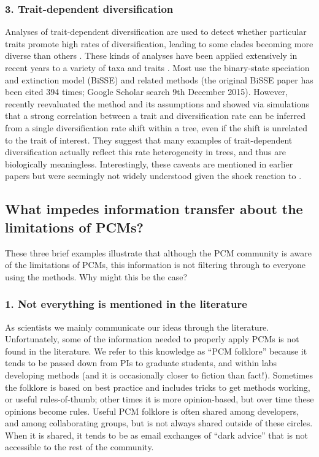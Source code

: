 \documentclass[a4paper,12pt]{article}
\begin{document}
\subsubsection{3. Trait-dependent diversification} 
Analyses of trait-dependent diversification are used to detect whether particular traits promote high rates of diversification, leading to some clades becoming more diverse than others \citep{nee1994reconstructed}. 
These kinds of analyses have been applied extensively in recent years to a variety of taxa and traits \citep[e.g.][]{Goldberg22102010,Price01052012,Givnish201455,ELE:ELE12168}.
Most use the binary-state speciation and extinction model (BiSSE) and related methods (the original BiSSE paper \citet{maddison2007estimating} has been cited 394 times; Google Scholar search 9th December 2015).
However, \citet{rabosky2015model} recently reevaluated the method and its assumptions and showed via simulations that a strong correlation between a trait and diversification rate can be inferred from a single diversification rate shift within a tree, even if the shift is unrelated to the trait of interest.
They suggest that many examples of trait-dependent diversification actually reflect this rate heterogeneity in trees, and thus are biologically meaningless.
Interestingly, these caveats are mentioned in earlier papers \citep{maddison2007estimating,fitzjohn2010quantitative,FitzJohn:2012aa} but were seemingly not widely understood given the shock reaction to \citet{rabosky2015model}.

\subsection{What impedes information transfer about the limitations of PCMs?}
These three brief examples illustrate that although the PCM community is aware of the limitations of PCMs, this information is not filtering through to everyone using the methods. 
Why might this be the case?

  \subsubsection{1. Not everything is mentioned in the literature}
    As scientists we mainly communicate our ideas through the literature. 
    Unfortunately, some of the information needed to properly apply PCMs is not found in the literature. 
    We refer to this knowledge as ``PCM folklore'' because it tends to be passed down from PIs to graduate students, and within labs developing methods (and it is occasionally closer to fiction than fact!).
    Sometimes the folklore is based on best practice and includes tricks to get methods working, or useful rules-of-thumb; other times it is more opinion-based, but over time these opinions become rules. 
    Useful PCM folklore is often shared among developers, and among collaborating groups, but is not always shared outside of these circles. 
    When it is shared, it tends to be as email exchanges of ``dark advice'' that is not accessible to the rest of the community.
\end{document}
